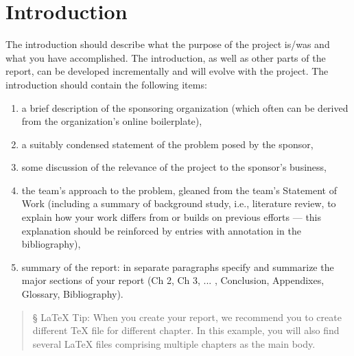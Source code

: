 \chapter{Introduction}\label{Ch:Introduction}

The introduction should describe what the purpose of the project is/was and what you have accomplished.
The introduction, as well as other parts of the report, can be developed incrementally and will evolve with the project.
The introduction should contain the following items:
\begin{enumerate}
\item a brief description of the sponsoring organization (which often can be derived from the organization's online boilerplate), 
\item a suitably condensed statement of the problem posed by the sponsor, 
\item some discussion of the relevance of the project to the sponsor's business, 
\item the team's approach to the problem, gleaned from the team's Statement of Work (including a summary of background study, i.e., literature review, to explain how your work differs from or builds on previous efforts --- this explanation should be reinforced by entries with annotation in the bibliography),
\item summary of the report: in separate paragraphs specify and summarize the major sections of your report (Ch 2, Ch 3, ... , Conclusion,  Appendixes, Glossary, Bibliography).
\end{enumerate}

\begin{quote}
    \S{} \LaTeX{} Tip: When you create your report, we recommend you to create different TeX file for different chapter. In this example, you will also find several LaTeX files comprising multiple chapters as the main body.  
\end{quote}



\endinput